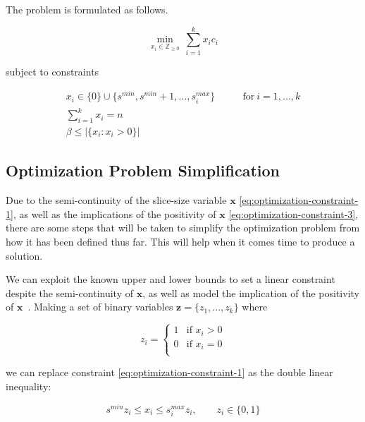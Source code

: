 \documentclass[../mthe-493-final-project.tex]{subfiles}
\begin{document}
    The problem is formulated as follows.

    \begin{equation}
        \label{eq:optimization-objective-function}
        \min_{x_i \in \mathbb{Z}_{\geq 0}} \ \sum_{i=1}^k x_i c_i
    \end{equation}

    subject to constraints

    \begin{align}
        x_i \in \{0\} \cup \{s^{min}, s^{min} + 1,...,s^{max}_i\} &\qquad \text{for} \ i=1,...,k \label{eq:optimization-constraint-1} \\
        \sum_{i = 1}^k x_i = n \label{eq:optimization-constraint-2} \\
        \beta \leq \vert \{x_i : x_i > 0\} \vert \label{eq:optimization-constraint-3}
    \end{align}
    
    \subsection{Optimization Problem Simplification}
    \label{ssec:optimization-problem-simplification}
    
     Due to the semi-continuity of the slice-size variable $\mathbf{x}$ \eqref{eq:optimization-constraint-1}, as well as the implications of the positivity of $\mathbf{x}$ \eqref{eq:optimization-constraint-3}, there are some steps that will be taken to simplify the optimization problem from how it has been defined thus far. This will help when it comes time to produce a solution.
     
     We can exploit the known upper and lower bounds to set a linear constraint despite the semi-continuity of $\mathbf{x}$, as well as model the implication of the positivity of $\mathbf{x}$~\cite{9_mixed_integer_optimization_mosek_modeling_cookbook_3.2.3_2021}. Making a set of binary variables $\mathbf{z} = \{z_1,...,z_k\}$ where
     
    \[z_i =
        \begin{cases}
            1 & \text{if $x_i > 0$}\\
            0 & \text{if $x_i = 0$}\\
        \end{cases}
    \]
     
     we can replace constraint \eqref{eq:optimization-constraint-1} as the double linear inequality:
     
     \begin{equation}
         s^{min}z_i \leq x_i \leq s_i^{max}z_i, \qquad z_i \in \{0,1\}
     \end{equation}
     
\end{document}
